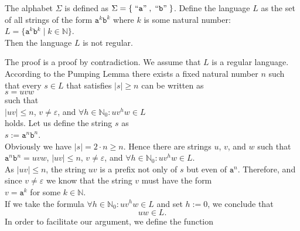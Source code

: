 \begin{Proposition}
  The alphabet  $\Sigma$ is defined as $\Sigma = \{ \;\mbox{``\texttt{a}''}\;, \;\mbox{``\texttt{b}''}\; \}$.
  Define the language $L$ as the set of all strings of the form $\mathtt{a}^k\mathtt{b}^k$ where $k$
  is some natural number:
  \\[0.2cm]
  \hspace*{1.3cm}
  $L = \bigl\{ \mathtt{a}^k\mathtt{b}^k \mid k \in \mathbb{N} \bigr\}$.
  \\[0.2cm]
  Then the language  $L$ is not regular.
\end{Proposition}

\proofEng
The proof is a proof by contradiction. We assume that $L$ is a regular language.  According to the
Pumping Lemma there exists a fixed natural number $n$ such that every $s \in L$ that satisfies  $|s|
\geq n$ can be written as
\\[0.2cm]
\hspace*{1.3cm}
$s = uvw$
\\[0.2cm]
such that
\\[0.2cm]
\hspace*{1.3cm}
$|uv| \leq n$, \quad $v \not= \varepsilon$, \quad and \quad $\forall h \in \mathbb{N}_0: uv^h w \in L$
\\[0.2cm]
holds.  Let us define the string $s$ as
\\[0.2cm]
\hspace*{1.3cm}
$s := \mathtt{a}^{n} \mathtt{b}^{n}$.
\\[0.2cm]
Obviously we have $|s| = 2 \cdot n \geq n$.  Hence there are strings $u$, $v$, and $w$
such that 
\\[0.2cm]
\hspace*{1.3cm}
$\mathtt{a}^{n}\mathtt{b}^{n} = uvw$, \quad $|uv| \leq n$, \quad $v \not= \varepsilon$, 
\quad and \quad $\forall h \in \mathbb{N}_0: uv^h w \in L$.
\\[0.2cm]
As $|uv| \leq n$, the string $uv$ is a prefix not only of $s$ but even of $\mathtt{a}^n$. Therefore,
and since $v \not= \varepsilon$ we know that the string $v$ must have the form
\\[0.2cm]
\hspace*{1.3cm}
$v = \mathtt{a}^k$ \quad for some $k \in \mathbb{N}$.
\\[0.2cm]
If we take the formula $\forall h \in \mathbb{N}_0: uv^h w \in L$ and set  $h:=0$, we conclude that
\begin{equation}
  \label{eq:pumping5}
 uw \in L. 
\end{equation}
In order to facilitate our argument, we define the function
